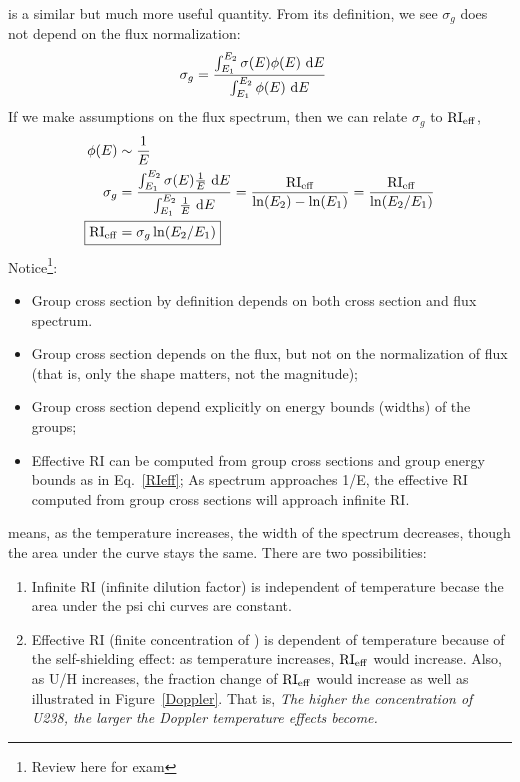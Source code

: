 \documentclass{school-22.211-notes}
\begin{document}
 is a similar but much more useful quantity. From its definition, we see $\sigma_g$ does not depend on the flux normalization: 
\begin{align}
\sigma_g &= \frac{\int_{E_1}^{E_2} \sigma(E) \phi(E) \mbox{ }\mathrm{d} E }{\int_{E_1}^{E_2} \phi(E) \mbox{ }\mathrm{d} E} 
\end{align}
If we make assumptions on the flux spectrum, then we can relate $\sigma_g$ to $\mathrm{RI}_{\mathrm{eff}}$,
\begin{align}
\phi(E) &\sim \frac{1}{E} \\
\sigma_g &= \frac{\int_{E_1}^{E_2} \sigma(E) \frac{1}{E} \dE }{\int_{E_1}^{E_2} \frac{1}{E} \dE} 
= \frac{\RI_{\eff}}{\ln(E_2) - \ln(E_1)}  
= \frac{\RI_{\eff}}{\ln(E_2/E_1)} \\
\Aboxed{\RI_{\eff} &= \sigma_g \ln(E_2/E_1) } \label{RIeff}
\end{align}
Notice\footnote{Review here for exam}:
\begin{itemize}
\item Group cross section by definition depends on both cross section and flux spectrum. 
\item Group cross section depends on the flux, but not on the normalization of flux (that is, only the shape matters, not the magnitude);
\item Group cross section depend explicitly on energy bounds (widths) of the groups; 
\item Effective RI can be computed from group cross sections and group energy bounds as in Eq.~\ref{RIeff}; As spectrum approaches 1/E, the effective RI computed from group cross sections will approach infinite RI. 
\end{itemize}


\clearpage
{}
 means, as the temperature increases, the width of the spectrum decreases, though the area under the curve stays the same. There are two possibilities: 
\begin{enumerate}
\item Infinite RI (infinite dilution factor) is independent of temperature becase the area under the psi chi curves are constant. 
\item Effective RI (finite concentration of ) is dependent of temperature because of the self-shielding effect: as temperature increases, $\mathrm{RI}_{\mathrm{eff}}$ would increase. Also, as U/H increases, the fraction change of $\mathrm{RI}_{\mathrm{eff}}$ would increase as well as illustrated in Figure~\ref{Doppler}. That is, \textit{The higher the concentration of U238, the larger the Doppler temperature effects become.}
\end{enumerate}
\end{document}
